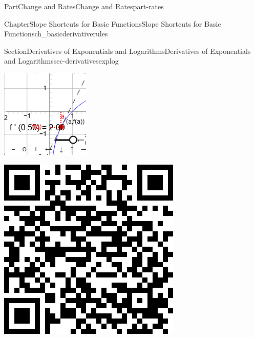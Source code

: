 \documentclass{tufte-book}
\numberwithin{equation}{chapter}
\begin{document}
\begin{partptx}{Part}{Change and Rates}{}{Change and Rates}{}{}{part-rates}
\begin{chapterptx}{Chapter}{Slope Shortcuts for Basic Functions}{}{Slope Shortcuts for Basic Functions}{}{}{ch_basicderivativerules}
\begin{sectionptx}{Section}{Derivatives of Exponentials and Logarithms}{}{Derivatives of Exponentials and Logarithms}{}{}{sec-derivativesexplog}
\begin{sidebyside}{2}{0.075}{0.075}{0.17}
\begin{sbspanel}{0.47}
\includegraphics[width=\linewidth]{external/jsxgraph-findingslopefromtangent-exercise2d.png}
\end{sbspanel}%
\begin{sbspanel}{0.21}%
\includegraphics[width=\linewidth]{generated/qrcode/sec-derivativesexplog-7-5.png}

\end{sbspanel}
\end{sidebyside}
\end{sectionptx}
\end{chapterptx}
\end{partptx}
\end{document}
